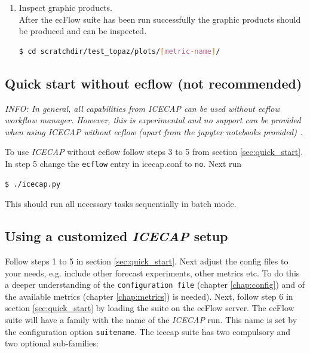 \documentclass[DIV=10, parskip=full]{scrreprt}
\newcommand{\ice}{\textit{ICECAP}\xspace}
\newcommand{\info}[1]{\textit{INFO: #1}}
\begin{document}
\begin{enumerate}
	\item Inspect graphic products.  \\
	After the ecFlow suite has been run successfully the graphic products should be produced and can be inspected.
	\begin{lstlisting}[language=bash]
		$ cd scratchdir/test_topaz/plots/[metric-name]/
	\end{lstlisting}
	
\end{enumerate}

\subsection{Quick start without ecflow (not recommended)}
\info{In general, all capabilities from \ice can be used without ecflow workflow manager. However, this is experimental and no support can be provided when using \ice without ecflow (apart from the jupyter notebooks provided) . }

To use \ice without ecflow follow steps 3 to 5 from section \ref{sec:quick_start}. In step 5 change the \texttt{ecflow} entry in icecap.conf to \texttt{no}. Next run

\begin{lstlisting}[language=bash]
	$ ./icecap.py
\end{lstlisting}

This should run all necessary tasks sequentially in batch mode. 

\subsection{Using a customized \ice setup} 
Follow steps 1 to 5 in section \ref{sec:quick_start}. Next adjust the config files to your needs, e.g. include other forecast experiments, other metrics etc. To do this a deeper understanding of the \texttt{configuration file} (chapter \ref{chap:config}) and of the available metrics (chapter \ref{chap:metrics}) is needed). Next, follow step 6 in section \ref{sec:quick_start} by loading the suite on the ecFlow server. The ecFlow suite will have a family with the name of the \ice run. This name is set by the configuration option \texttt{suitename}. The icecap suite has two compulsory and two optional sub-families:
\end{document}
